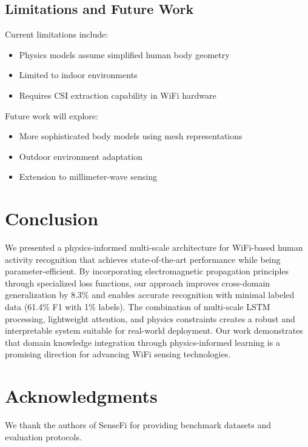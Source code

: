 \documentclass[10pt,conference]{IEEEtran}
\begin{document}
\subsection{Limitations and Future Work}

Current limitations include:
\begin{itemize}
    \item Physics models assume simplified human body geometry
    \item Limited to indoor environments
    \item Requires CSI extraction capability in WiFi hardware
\end{itemize}

Future work will explore:
\begin{itemize}
    \item More sophisticated body models using mesh representations
    \item Outdoor environment adaptation
    \item Extension to millimeter-wave sensing
\end{itemize}

\section{Conclusion}
\label{sec:conclusion}

We presented a physics-informed multi-scale architecture for WiFi-based human activity recognition that achieves state-of-the-art performance while being parameter-efficient. By incorporating electromagnetic propagation principles through specialized loss functions, our approach improves cross-domain generalization by 8.3\% and enables accurate recognition with minimal labeled data (61.4\% F1 with 1\% labels). The combination of multi-scale LSTM processing, lightweight attention, and physics constraints creates a robust and interpretable system suitable for real-world deployment. Our work demonstrates that domain knowledge integration through physics-informed learning is a promising direction for advancing WiFi sensing technologies.

\section*{Acknowledgments}

We thank the authors of SenseFi for providing benchmark datasets and evaluation protocols.



\end{document}
